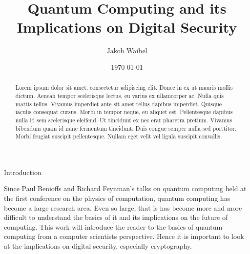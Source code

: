 \documentclass[aps,preprintnumbers,twocolumn]{revtex4}
\begin{document}
\title{Quantum Computing and its Implications on Digital Security}
\author{Jakob Waibel}


\date{\today}

\begin{abstract}
Lorem ipsum dolor sit amet, consectetur adipiscing elit. Donec in ex ut mauris mollis dictum. Aenean tempor scelerisque lectus, eu varius ex ullamcorper ac. Nulla quis mattis tellus. Vivamus imperdiet ante sit amet tellus dapibus imperdiet. Quisque iaculis consequat cursus. Morbi in tempor neque, eu aliquet est. Pellentesque dapibus nulla id sem scelerisque eleifend. Ut tincidunt ex nec erat pharetra pretium. Vivamus bibendum quam id nunc fermentum tincidunt. Duis congue semper nulla sed porttitor. Morbi feugiat suscipit pellentesque. Nullam eget velit vel ligula suscipit convallis.
\end{abstract}

\maketitle

\begin{section}{Introduction}
    
Since Paul Benioffs and Richard Feynman's talks on quantum computing held at the first conference on the physics of computation, 
quantum computing has become a large research area. 
Even so large, that is has become more and more difficult to understand the basics of it and its implications on the future of computing. 
This work will introduce the reader to the basics of quantum computing from a computer scientists perspective. 
Hence it is important to look at the implications on digital security, especially cryptography.

\end{section}
\end{document}
